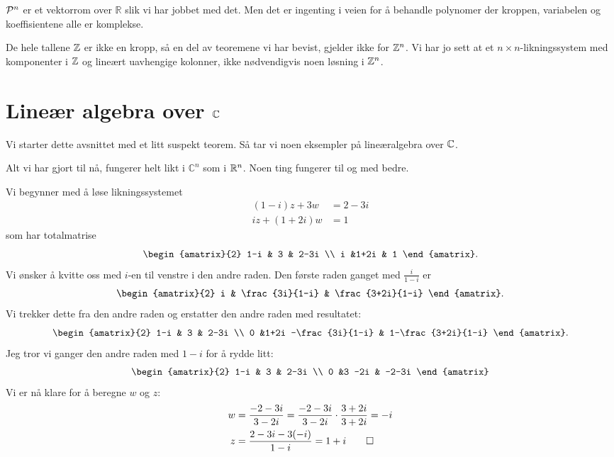\begin{ex}
$\P^n$ er et vektorrom over $\mathbb R$ slik vi har jobbet med det. 
Men det er ingenting i veien for å behandle polynomer der kroppen, variabelen og koeffisientene alle er komplekse.
\end{ex}


\begin{ex}
De hele tallene $\Z$ er ikke en kropp, så en del av teoremene vi har bevist, gjelder ikke for $\Z^n$. 
Vi har jo sett at et $n\times n$-likningssystem med komponenter i $\Z$ og lineært uavhengige kolonner,  
ikke nødvendigvis noen løsning i $\Z^n$. 
\end{ex}



\section*{Lineær algebra over $\C$}

Vi starter dette avsnittet med et litt suspekt teorem. Så tar vi noen eksempler på lineæralgebra over $\C$.

\begin{fishythm}
Alt vi har gjort til nå, fungerer helt likt i $\mathbb C^n$ som i $\R^n$. 
Noen ting fungerer til og med bedre.
\end{fishythm}




\begin{ex}
Vi begynner med å løse likningssystemet
\begin{align*}
(1-i) z + 3w   &= 2-3i \\
i z + (1+2i) w &= 1
\end{align*}
som har totalmatrise
\[
\begin{amatrix}{2}
1-i & 3 & 2-3i \\ i &1+2i & 1
\end{amatrix}.
\]
Vi ønsker å kvitte oss med $i$-en til venstre i den andre raden. 
Den første raden ganget  med $\frac{i}{1-i}$ er
\[
\begin{amatrix}{2}
i & \frac{3i}{1-i} & \frac{3+2i}{1-i} 
\end{amatrix}.
\]
Vi trekker dette fra den andre raden og erstatter den andre raden med resultatet:
\[
\begin{amatrix}{2}
1-i & 3 & 2-3i \\ 0 &1+2i -\frac{3i}{1-i} & 1-\frac{3+2i}{1-i} 
\end{amatrix}.
\]
Jeg tror vi ganger den andre raden med $1-i$ for å rydde litt:
\[
\begin{amatrix}{2}
1-i & 3 & 2-3i \\ 0 &3 -2i  & -2-3i
\end{amatrix}
\]
Vi er nå klare for å beregne $w$ og $z$:
\begin{align*}
w&=\frac{-2-3i}{3-2i}=\frac{-2-3i}{3-2i}\cdot \frac{3+2i}{3+2i}=-i \\
z&=\frac{2-3i-3(-i)}{1-i}=1+i \qedhere
\end{align*}
\end{ex}

